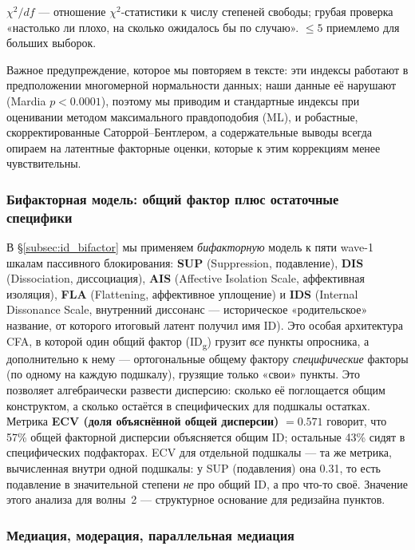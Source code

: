 \textbf{$\chi^2/df$} --- отношение $\chi^2$-статистики к числу степеней свободы; грубая проверка «настолько ли плохо, на сколько ожидалось бы по случаю». $\leq 5$ приемлемо для больших выборок.

Важное предупреждение, которое мы повторяем в тексте: эти индексы работают в предположении многомерной нормальности данных; наши данные её нарушают (Mardia $p < 0.0001$), поэтому мы приводим и стандартные индексы при оценивании методом максимального правдоподобия (ML), и робастные, скорректированные Саторрой--Бентлером, а содержательные выводы всегда опираем на латентные факторные оценки, которые к этим коррекциям менее чувствительны.

\subsubsection{Бифакторная модель: общий фактор плюс остаточные специфики}

В §\ref{subsec:id_bifactor} мы применяем \emph{бифакторную} модель к пяти wave-1 шкалам пассивного блокирования: \textbf{SUP} (Suppression, подавление), \textbf{DIS} (Dissociation, диссоциация), \textbf{AIS} (Affective Isolation Scale, аффективная изоляция), \textbf{FLA} (Flattening, аффективное уплощение) и \textbf{IDS} (Internal Dissonance Scale, внутренний диссонанс --- историческое «родительское» название, от которого итоговый латент получил имя ID). Это особая архитектура CFA, в которой один общий фактор (ID\textsubscript{g}) грузит \emph{все} пункты опросника, а дополнительно к нему --- ортогональные общему фактору \emph{специфические} факторы (по одному на каждую подшкалу), грузящие только «свои» пункты. Это позволяет алгебраически развести дисперсию: сколько её поглощается общим конструктом, а сколько остаётся в специфических для подшкалы остатках. Метрика \textbf{ECV (доля объяснённой общей дисперсии)} $= 0.571$ говорит, что 57\% общей факторной дисперсии объясняется общим ID; остальные 43\% сидят в специфических подфакторах. ECV для отдельной подшкалы --- та же метрика, вычисленная внутри одной подшкалы: у SUP (подавления) она 0.31, то есть подавление в значительной степени \emph{не} про общий ID, а про что-то своё. Значение этого анализа для волны~2 --- структурное основание для редизайна пунктов.

\subsubsection{Медиация, модерация, параллельная медиация}

